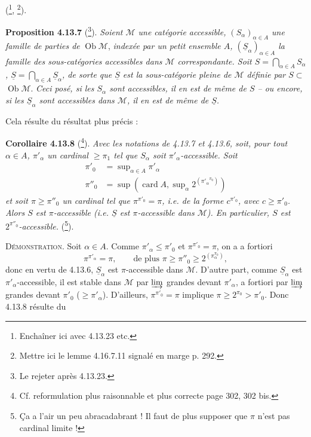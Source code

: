 \documentclass[11pt]{article}
\newcommand{\printedpage}[1]{\marginpar{\footnotesize p.~#1}}
\newcommand{\msp}[1]{\marginpar{\footnotesize [#1]}}
\newcommand{\Ob}{\operatorname{Ob}}
\newcommand{\card}{\operatorname{card}}
\newcommand{\M}{\mathcal{M}}
\newcommand{\uS}{\underline{S}}
\begin{document}
(\footnote[119]{Enchaîner ici avec 4.13.23 etc.}, \footnote[120]{Mettre ici le lemme 4.16.7.11 signalé en marge p. 292.}).

\printedpage{108}
\msp{page 291}
\textbf{Proposition 4.13.7} (\footnote[121]{Le rejeter après 4.13.23.}). \textit{Soient $\M$ une catégorie accessible, $(S_\alpha)_{\alpha\in A}$ une famille de parties de} $\Ob\M$, \textit{indexée par un petit ensemble $A$, $(\uS_\alpha)_{\alpha\in A}$ la famille des sous-catégories accessibles dans $\M$ correspondante. Soit $S = \bigcap_{\alpha\in A} S_\alpha$, $\uS = \bigcap_{\alpha\in A} \uS_\alpha$, de sorte que $\uS$ est la sous-catégorie pleine de $\M$ définie par $S \subset$} $\Ob\M$. \textit{Ceci posé, si les $S_\alpha$ sont accessibles, il en est de même de $S$ – ou encore, si les $\uS_\alpha$ sont accessibles dans $\M$, il en est de même de $\uS$.}

Cela résulte du résultat plus précis :

\textbf{Corollaire 4.13.8} (\footnote[122]{Cf. reformulation plus raisonnable et plus correcte page 302, 302 bis.}). \textit{Avec les notations de 4.13.7 et 4.13.6, soit, pour tout $\alpha \in A$, $\pi'_\alpha$ un cardinal $\geqslant \pi_1$ tel que $S_\alpha$ soit $\pi'_\alpha$-accessible. Soit}
\[
\begin{aligned}
\pi'_0 &= \sup\nolimits_{\alpha\in A} \pi'_\alpha \\
\pi''_0 &= \sup(\card A, \sup\nolimits_\alpha 2^{({\pi'_\alpha}^{\pi_0})})
\end{aligned}
\]
\textit{et soit $\pi \geqslant \pi''_0$ un cardinal tel que $\pi^{\pi'_0} = \pi$, i.e. de la forme $c^{\pi'_0}$, avec $c \geqslant \pi'_0$. Alors $S$ est $\pi$-accessible (i.e. $\uS$ est $\pi$-accessible dans $\M$). En particulier, $S$ est $2^{\pi''_0}$-accessible.} (\footnote[123]{Ça a l'air un peu abracadabrant ! Il faut de plus supposer que $\pi$ n'est pas cardinal limite !}).

\msp{page 292}
\textsc{Démonstration}. Soit $\alpha \in A$. Comme $\pi'_\alpha \leqslant \pi'_0$ et $\pi^{\pi'_0} = \pi$, on a a fortiori
\[
\pi^{\pi'_\alpha} = \pi , \qquad \text{de plus } \pi \geqslant \pi''_0 \geqslant 2^{(\pi_\alpha^{\pi_0})} , %
\]
donc en vertu de 4.13.6, $\uS_\alpha$ est $\pi$-accessible dans $\M$. D'autre part, comme $\uS_\alpha$ est $\pi'_\alpha$-accessible, il est stable dans $\M$ par $\varinjlim$ grandes devant $\pi'_\alpha$, a fortiori par $\varinjlim$ grandes devant $\pi'_0$ ($\geqslant \pi'_\alpha$). D'ailleurs, $\pi^{\pi'_0} = \pi$ implique $\pi \geqslant 2^{\pi_0} > \pi'_0$. Donc 4.13.8 résulte du
\end{document}
